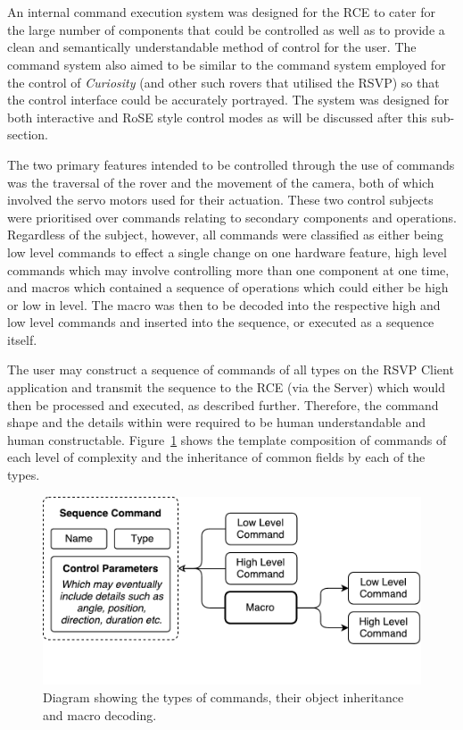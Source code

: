         \\\\
          An internal command execution system was designed for the RCE to cater for the large number of components that could be controlled as well as to provide a clean and semantically understandable method of control for the user. The command system also aimed to be similar to the command system employed for the control of \textit{Curiosity} (and other such rovers that utilised the RSVP) so that the control interface could be accurately portrayed. The system was designed for both interactive and RoSE style control modes as will be discussed after this sub-section.
          
          The two primary features intended to be controlled through the use of commands was the traversal of the rover and the movement of the camera, both of which involved the servo motors used for their actuation. These two control subjects were prioritised over commands relating to secondary components and operations. Regardless of the subject, however, all commands were classified as either being low level commands to effect a single change on one hardware feature, high level commands which may involve controlling more than one component at one time, and macros which contained a sequence of operations which could either be high or low in level. The macro was then to be decoded into the respective high and low level commands and inserted into the sequence, or executed as a sequence itself.
          
          The user may construct a sequence of commands of all types on the RSVP Client application and transmit the sequence to the RCE (via the Server) which would then be processed and executed, as described further. Therefore, the command shape and the details within were required to be human understandable and human constructable. Figure~\ref{fig:softDesign-cmdStructureDesign} shows the template composition of commands of each level of complexity and the inheritance of common fields by each of the types.
          
          \begin{figure}[h!]
            \centering
            \includegraphics[width=0.65\linewidth]{figures/softDesign-cmdStructureDesign}
            \caption[Diagram showing the types of commands, their object inheritance and macro decoding.]{Diagram showing the types of commands, their object inheritance and macro decoding.}
            \label{fig:softDesign-cmdStructureDesign}
          \end{figure}
          
